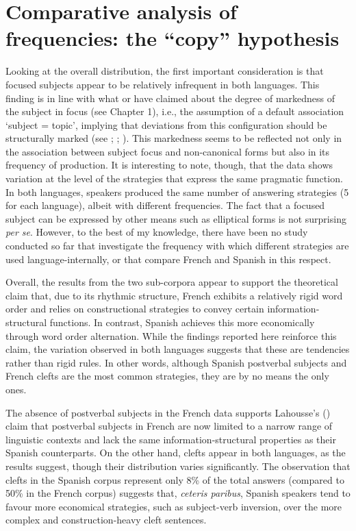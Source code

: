 \section{Comparative analysis of frequencies: the ``copy” hypothesis}
Looking at the overall distribution, the first important consideration is that focused subjects appear to be relatively infrequent in both languages. This finding is in line with what \textcite{lambrecht1996information} or \textcite{skopeteas2010focus} have claimed about the degree of markedness of the subject in focus (see Chapter 1), i.e., the assumption of a default association ‘subject = topic’, implying that deviations from this configuration should be structurally marked (see \cite[490]{lambrecht2001framework}; \cite[336]{zerbian2007investigating}; \cite{hartmann2007place}). This markedness seems to be reflected not only in the association between subject focus and non-canonical forms but also in its frequency of production. It is interesting to note, though, that the data shows variation at the level of the strategies that express the same pragmatic function. In both languages, speakers produced the same number of answering strategies (5 for each language), albeit with different frequencies. The fact that a focused subject can be expressed by other means such as elliptical forms is not surprising \textit{per se}. However, to the best of my knowledge, there have been no study  conducted so far that investigate the frequency with which different strategies are used language-internally, or that compare French and Spanish in this respect.

Overall, the results from the two sub-corpora appear to support the theoretical claim that, due to its rhythmic structure, French exhibits a relatively rigid word order and relies on constructional strategies to convey certain information-structural functions. In contrast, Spanish achieves this more economically through word order alternation. While the findings reported here reinforce this claim, the variation observed in both languages suggests that these are tendencies rather than rigid rules. In other words, although Spanish postverbal subjects and French clefts are the most common strategies, they are by no means the only ones. 

The absence of postverbal subjects in the French data supports Lahousse's (\citeyear{lahousse2006, Lahousse2011}) claim that postverbal subjects in French are now limited to a narrow range of linguistic contexts and lack the same information-structural properties as their Spanish counterparts. On the other hand, clefts appear in both languages, as the results suggest, though their distribution varies significantly. The observation that clefts in the Spanish corpus represent only 8\% of the total answers (compared to 50\% in the French corpus) suggests that, \textit{ceteris paribus}, Spanish speakers tend to favour more economical strategies, such as subject-verb inversion, over the more complex and construction-heavy cleft sentences.

